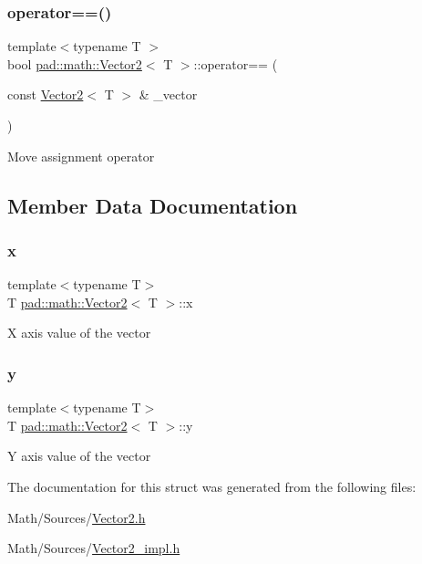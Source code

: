 \subsubsection{\texorpdfstring{operator==()}{operator==()}}
{\footnotesize\ttfamily template$<$typename T $>$ \\
bool \mbox{\hyperlink{structpad_1_1math_1_1_vector2}{pad\+::math\+::\+Vector2}}$<$ T $>$\+::operator== (\begin{DoxyParamCaption}\item[{const \mbox{\hyperlink{structpad_1_1math_1_1_vector2}{Vector2}}$<$ T $>$ \&}]{\+\_\+vector }\end{DoxyParamCaption})}

Move assignment operator 

\subsection{Member Data Documentation}
\mbox{\label{structpad_1_1math_1_1_vector2_a3d4fc9deec4a8fd923ea4f5f73dfb763}} 
\subsubsection{\texorpdfstring{x}{x}}
{\footnotesize\ttfamily template$<$typename T$>$ \\
T \mbox{\hyperlink{structpad_1_1math_1_1_vector2}{pad\+::math\+::\+Vector2}}$<$ T $>$\+::x}

X axis value of the vector \mbox{\label{structpad_1_1math_1_1_vector2_a481eca28456d2e02f635059d379b89f5}} 
\subsubsection{\texorpdfstring{y}{y}}
{\footnotesize\ttfamily template$<$typename T$>$ \\
T \mbox{\hyperlink{structpad_1_1math_1_1_vector2}{pad\+::math\+::\+Vector2}}$<$ T $>$\+::y}

Y axis value of the vector 

The documentation for this struct was generated from the following files\+:\begin{DoxyCompactItemize}
\item 
Math/\+Sources/\mbox{\hyperlink{_vector2_8h}{Vector2.\+h}}\item 
Math/\+Sources/\mbox{\hyperlink{_vector2__impl_8h}{Vector2\+\_\+impl.\+h}}\end{DoxyCompactItemize}
